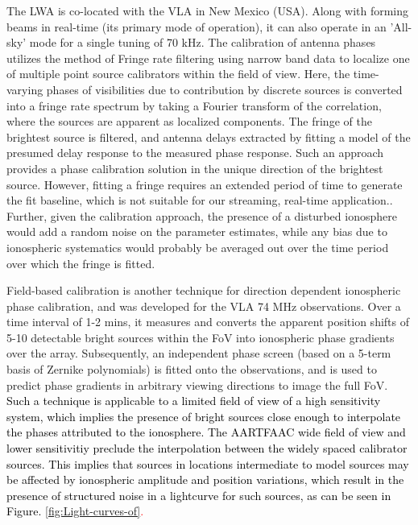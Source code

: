 \documentclass{aa}
\begin{document}
The LWA\cite{ellingsonLWA1} is co-located with the VLA in New Mexico
(USA). Along with forming beams in real-time (its primary mode of
operation), it can also operate in an 'All-sky' mode for a single
tuning of 70 kHz. The calibration of antenna phases utilizes the method
of Fringe rate filtering using narrow band data to localize one of
multiple point source calibrators within the field of view. Here,
the time-varying phases of visibilities due to contribution by discrete
sources is converted into a fringe rate spectrum by taking a Fourier
transform of the correlation, where the sources are apparent as localized
components. The fringe of the brightest source is filtered, and antenna
delays extracted by fitting a model of the presumed delay response
to the measured phase response. Such an approach provides a phase
calibration solution in the unique direction of the brightest source.
However, fitting a fringe requires an extended period of time to generate
the fit baseline, which is not suitable for our streaming, real-time
application.. Further, given the calibration approach, the presence
of a disturbed ionosphere would add a random noise on the parameter
estimates, while any bias due to ionospheric systematics would probably
be averaged out over the time period over which the fringe is fitted.

Field-based calibration\cite{cottona2004beyond} is another technique
for direction dependent ionospheric phase calibration, and was developed
for the VLA 74 MHz observations. Over a time interval of 1-2 mins,
it measures and converts the apparent position shifts of 5-10 detectable
bright sources within the FoV into ionospheric phase gradients over
the array. Subsequently, an independent phase screen (based on a 5-term
basis of Zernike polynomials) is fitted onto the observations, and
is used to predict phase gradients in arbitrary viewing directions
to image the full FoV.\textcolor{red}{{} }\textcolor{black}{Such a technique
is applicable to a limited field of view of a high sensitivity system,
which implies the presence of bright sources close enough to interpolate
the phases attributed to the ionosphere. The AARTFAAC wide field of
view and lower sensitivitiy preclude the interpolation between the
widely spaced calibrator sources. This implies that sources in locations
intermediate to model sources may be affected by ionospheric amplitude
and position variations, which result in the presence of structured
noise in a lightcurve for such sources, as can be seen in Figure.}\textcolor{red}{{}
\ref{fig:Light-curves-of}.}
\end{document}
